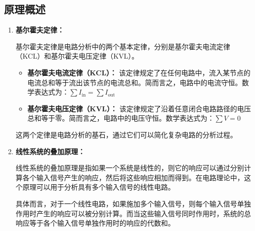 \documentclass[dvipsnames, svgnames,a4paper,11pt]{article}
\begin{document}
	\subsection{原理概述}
	\begin{enumerate}
		\item \textbf{基尔霍夫定律：}
		
		基尔霍夫定律是电路分析中的两个基本定律，分别是基尔霍夫电流定律（KCL）和基尔霍夫电压定律（KVL）。
		
		\begin{itemize}
			\item \textbf{基尔霍夫电流定律（KCL）：} 该定律规定了在任何电路中，流入某节点的电流总和等于流出该节点的电流总和。简而言之，电路中的电流守恒。数学表达式为：$\sum I_{\text{in}} = \sum I_{\text{out}}$
			
			\item \textbf{基尔霍夫电压定律（KVL）：} 该定律规定了沿着任意闭合电路路径的电压总和等于零。简而言之，电路中的电压守恒。数学表达式为：$\sum V = 0$
		\end{itemize}
		
		这两个定律是电路分析的基石，通过它们可以简化复杂电路的分析过程。
		
		\item \textbf{线性系统的叠加原理：}
		
		线性系统的叠加原理是指如果一个系统是线性的，则它的响应可以通过分别计算各个输入信号产生的响应，然后将这些响应相加而得到。在电路理论中，这个原理可以用于分析具有多个输入信号的线性电路。
		
		具体而言，对于一个线性电路，如果施加多个输入信号，则每个输入信号单独作用时产生的响应可以被分别计算。而当这些输入信号同时作用时，系统的总响应等于各个输入信号单独作用时的响应的代数和。
		
	\end{enumerate}
	
\end{document}
